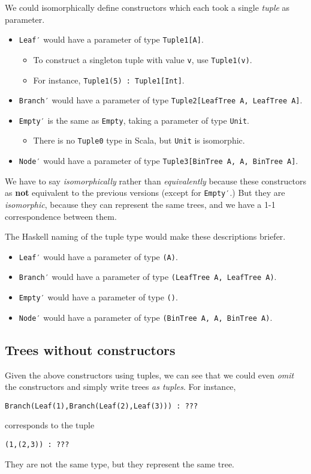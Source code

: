 \documentclass[11pt]{article}
\begin{document}
We could isomorphically define constructors
which each took a single \emph{tuple} as parameter.
\begin{itemize}
\item \texttt{Leaf′} would have a parameter of type \texttt{Tuple1[A]}.
\begin{itemize}
\item To construct a singleton tuple with value \texttt{v}, use \texttt{Tuple1(v)}.
\item For instance, \texttt{Tuple1(5) : Tuple1[Int]}.
\end{itemize}
\item \texttt{Branch′} would have a parameter of type \texttt{Tuple2[LeafTree A, LeafTree A]}.
\item \texttt{Empty′} is the same as \texttt{Empty}, taking a parameter of type \texttt{Unit}.
\begin{itemize}
\item There is no \texttt{Tuple0} type in Scala, but \texttt{Unit} is isomorphic.
\end{itemize}
\item \texttt{Node′} would have a parameter of type \texttt{Tuple3[BinTree A, A, BinTree A]}.
\end{itemize}
We have to say \emph{isomorphically} rather than \emph{equivalently} because
these constructors as \textbf{not} equivalent to the previous versions
(except for \texttt{Empty′}.) But they are \emph{isomorphic}, because they can represent
the same trees, and we have a 1-1 correspondence between them.

The Haskell naming of the tuple type would make
these descriptions briefer.
\begin{itemize}
\item \texttt{Leaf′} would have a parameter of type \texttt{(A)}.
\item \texttt{Branch′} would have a parameter of type \texttt{(LeafTree A, LeafTree A)}.
\item \texttt{Empty′} would have a parameter of type \texttt{()}.
\item \texttt{Node′} would have a parameter of  type \texttt{(BinTree A, A, BinTree A)}.
\end{itemize}

\subsection{Trees without constructors}
\label{sec:org3c97dca}

Given the above constructors using tuples,
we can see that we could even \emph{omit} the constructors
and simply write trees \emph{as tuples}. For instance,
\begin{verbatim}
Branch(Leaf(1),Branch(Leaf(2),Leaf(3))) : ???
\end{verbatim}
corresponds to the tuple
\begin{verbatim}
(1,(2,3)) : ???
\end{verbatim}
They are not the same type, but they represent the same tree.
\end{document}

